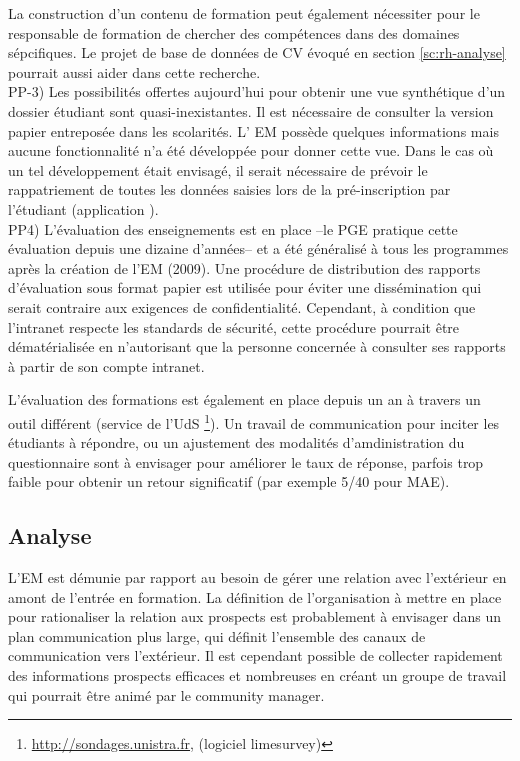 \documentclass{book}
\begin{document}
La construction d'un contenu de formation peut également nécessiter pour le 
responsable de formation de chercher des compétences dans des domaines sépcifiques. 
Le projet de base de données de CV évoqué en section \ref{sc:rh-analyse} pourrait 
aussi aider dans cette recherche.\\



PP-3) Les possibilités offertes aujourd'hui pour obtenir une vue synthétique
d'un dossier étudiant sont quasi-inexistantes. Il est nécessaire de consulter 
la version papier entreposée dans les scolarités. L' EM 
 possède quelques informations mais aucune fonctionnalité n'a été développée
pour donner cette vue. Dans le cas où un tel développement était envisagé,
il serait nécessaire de prévoir le rappatriement de toutes les données 
saisies lors de la pré-inscription par l'étudiant (application ).\\


PP4) L'évaluation des enseignements est en place --le PGE pratique cette évaluation 
depuis  une dizaine d'années-- et a été généralisé à tous les programmes après
la création de l'EM (2009). Une procédure de distribution des rapports d'évaluation
sous format papier est utilisée pour éviter une dissémination qui serait contraire
aux exigences de confidentialité. Cependant, à condition que l'intranet respecte 
les standards de sécurité, cette procédure pourrait être dématérialisée en n'autorisant
que la personne concernée à consulter ses rapports à partir de son compte intranet.

L'évaluation des formations est également en place depuis un an à travers 
un outil différent (service de l'UdS%
 \footnote{\url{http://sondages.unistra.fr}, (logiciel limesurvey)}).
Un travail de communication pour inciter les étudiants à répondre, ou un ajustement 
des modalités d'amdinistration du questionnaire sont à envisager pour améliorer
le taux de réponse, parfois trop faible pour obtenir un retour significatif (par
exemple 5/40 pour MAE).
\\



\subsection{Analyse}

L'EM est démunie par rapport au besoin de gérer une relation avec l'extérieur
en amont de l'entrée en formation. La définition de l'organisation à
mettre en place pour rationaliser la relation aux prospects est probablement à 
envisager dans un plan communication plus large, qui définit l'ensemble des canaux
de communication vers l'extérieur. Il est cependant possible de collecter rapidement
des informations prospects efficaces et nombreuses en créant un groupe de travail
qui pourrait être animé par le community manager.
\end{document}
